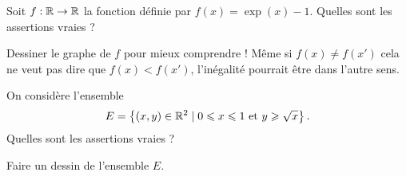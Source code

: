\begin{question}

Soit $f : \mathbb{R} \to \mathbb{R}$ la fonction définie par $f(x)=\exp(x)-1$.
Quelles sont les assertions vraies ?
\begin{answers}
\end{answers}
\begin{explanations}
Dessiner le graphe de $f$ pour mieux comprendre ! 
Même si $f(x) \neq f(x')$ cela ne veut pas dire que $f(x) < f(x')$, l'inégalité pourrait être dans l'autre sens.
\end{explanations}
\end{question}


\begin{question}

On considère l'ensemble 
$$E = \left\{ (x,y) \in \mathbb{R}^2 \mid 0 \leqslant x \leqslant 1 \text{ et } y \geqslant \sqrt{x}  \right\}.$$
Quelles sont les assertions vraies ?
\begin{answers}
    


\end{answers}
\begin{explanations}
Faire un dessin de l'ensemble $E$.
\end{explanations}
\end{question}



